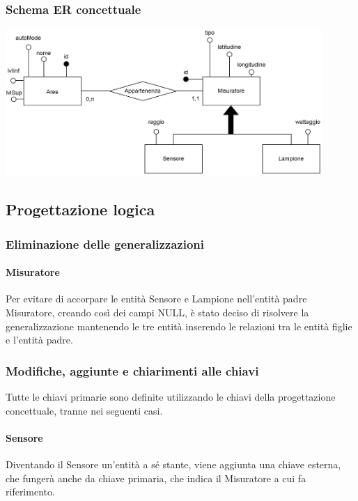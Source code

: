 \subsubsection{Schema ER concettuale}

\begin{center}
    \includegraphics[width=12cm]{contenuti/specifica-basi-dati/img-sbd/anagrafica_concettuale.png}
\end{center}

\subsection{Progettazione logica}

\subsubsection{Eliminazione delle generalizzazioni}

\paragraph{Misuratore}

Per evitare di accorpare le entità Sensore e Lampione nell'entità padre Misuratore, creando così dei campi NULL, è stato deciso di risolvere la generalizzazione mantenendo le tre entità inserendo le relazioni tra le entità figlie e l'entità padre.

\subsubsection{Modifiche, aggiunte e chiarimenti alle chiavi}

Tutte le chiavi primarie sono definite utilizzando le chiavi della progettazione concettuale, tranne nei seguenti casi.

\paragraph{Sensore} Diventando il Sensore un'entità a sé stante, viene aggiunta una chiave esterna, che fungerà anche da chiave primaria, che indica il Misuratore a cui fa riferimento.


